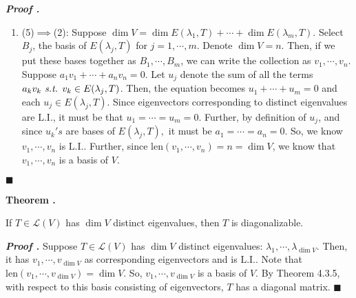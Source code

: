 \documentclass[11pt, letterpaper]{article}
\newcounter{index}[subsection]
\newenvironment*{thm}[1]{\begin{tcolorbox}\par\noindent\textbf{Theorem \thesubsection.\stepcounter{index}\theindex\ #1} \par}{\par\end{tcolorbox}}
\newcounter{nprf}[subsection]
\newenvironment*{prf}{\par\indent\textbf{\textit{Proof \stepcounter{nprf}\thenprf.}}}{\hfill$\blacksquare$\par}
\def\L{\mathcal{L}}
\def\st{\emph{ s.t. }}
\def\LI{\mathrm{L.I.}}
\def\len{\mathrm{len}}
\begin{document}
\begin{prf}
\begin{enumerate}
		\item (5)$\implies$(2): Suppose $\dim V=\dim E(\lambda_1,T)+\cdots+\dim E(\lambda_m,T).$ Select $B_j$, the basis of $E(\lambda_j,T)$ for $j=1,\cdots,m$. Denote $\dim V=n$. Then, if we put these bases together as $B_1,\cdots,B_m$, we can write the collection as $v_1,\cdots,v_n$. Suppose $a_1v_1+\cdots+a_nv_n=0$. Let $u_j$ denote the sum of all the terms $a_kv_k\st v_k\in E(\lambda_j,T)$. Then, the equation becomes $u_1+\cdots+u_m=0$ and each $u_j\in E(\lambda_j,T)$. Since eigenvectors corresponding to distinct eigenvalues are $\LI$, it must be that $u_1=\cdots=u_m=0$. Further, by definition of $u_j$, and since $u_k's$ are bases of $E(\lambda_j,T),$ it must be $a_1=\cdots=a_n=0$. So, we know $v_1,\cdots,v_n$ is $\LI$. Further, since $\len(v_1,\cdots,v_n)=n=\dim V$, we know that $v_1,\cdots,v_n$ is a basis of $V$.
	\end{enumerate}	
\end{prf}
\begin{thm}{}
	If $T\in\L(V)$ has $\dim V$ distinct eigenvalues, then $T$ is diagonalizable.	
\end{thm}
\begin{prf}
	Suppose $T\in\L(V)$ has $\dim V$ distinct eigenvalues: $\lambda_1,\cdots,\lambda_{\dim V}$. Then, it has $v_1,\cdots,v_{\dim V}$ as corresponding eigenvectors and is $\LI$. Note that $\len(v_1,\cdots,v_{\dim V})=\dim V$. So, $v_1,\cdots,v_{\dim V}$ is a basis of $V$. By Theorem 4.3.5, with respect to this basis consisting of eigenvectors, $T$ has a diagonal matrix. 	
\end{prf}
\end{document}
